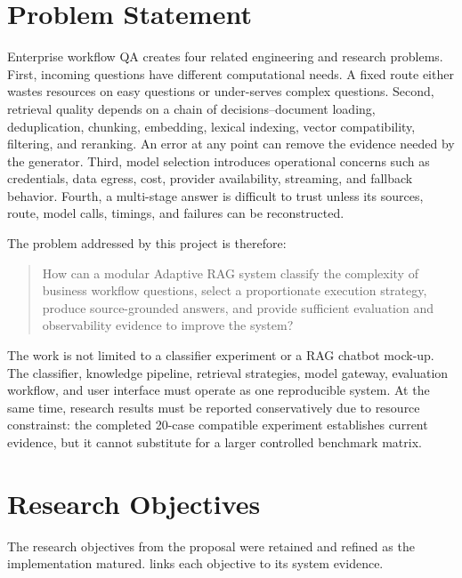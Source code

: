 \section{Problem Statement}

Enterprise workflow QA creates four related engineering and research problems.
First, incoming questions have different computational needs. A fixed route
either wastes resources on easy questions or under-serves complex questions.
Second, retrieval quality depends on a chain of decisions--document loading,
deduplication, chunking, embedding, lexical indexing, vector compatibility,
filtering, and reranking. An error at any point can remove the evidence needed
by the generator. Third, model selection introduces operational concerns such
as credentials, data egress, cost, provider availability, streaming, and
fallback behavior. Fourth, a multi-stage answer is difficult to trust unless
its sources, route, model calls, timings, and failures can be reconstructed.

The problem addressed by this project is therefore:

\begin{quote}
How can a modular Adaptive RAG system classify the complexity of business
workflow questions, select a proportionate execution strategy, produce
source-grounded answers, and provide sufficient evaluation and observability
evidence to improve the system?
\end{quote}

The work is not limited to a classifier experiment or a RAG chatbot mock-up. The
classifier, knowledge pipeline, retrieval strategies, model gateway,
evaluation workflow, and user interface must operate as one reproducible
system. At the same time, research results must be reported conservatively due to resource constrainst:
the completed 20-case compatible experiment establishes current evidence, but
it cannot substitute for a larger controlled benchmark matrix.

\section{Research Objectives}

The research objectives from the proposal were retained and refined as the
implementation matured.  links each objective to
its system evidence.

